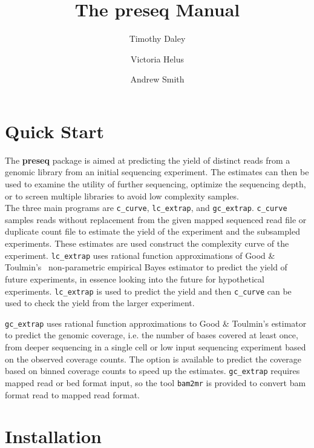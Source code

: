 \documentclass[11pt, titlepage]{article}
\title{The preseq Manual}
\author{Timothy Daley \and Victoria Helus \and Andrew Smith }
\begin{document}
\maketitle

\tableofcontents

\newpage

\section{Quick Start}
\label{chap:quickstart}
\newcommand{\fn}[1]{\texttt{#1}}



The \textbf{preseq} package is aimed at predicting
the yield of distinct reads from a genomic library
from an initial sequencing experiment.  The estimates
can then be used to examine the utility of further
sequencing, optimize the sequencing depth,
or to screen multiple libraries to avoid low complexity
samples.~\\[-.2cm]

\noindent The three main programs are \fn{c\_curve}, \fn{lc\_extrap},
and \fn{gc\_extrap}.
\fn{c\_curve} samples reads without replacement from the 
given mapped sequenced read file or duplicate count file to estimate the yield
of the experiment and the subsampled experiments.  These estimates
are used construct the complexity
curve of the experiment.  \fn{lc\_extrap} uses rational function approximations
of Good \& Toulmin's~\cite{good1956number} non-parametric
empirical Bayes estimator to predict the yield
of future experiments, in essence looking into the future
for hypothetical experiments.  \fn{lc\_extrap} is used to predict 
the yield and then \fn{c\_curve} can be used to check the yield
from the larger experiment.

\fn{gc\_extrap} uses rational function approximations
to Good \& Toulmin's estimator to predict the genomic
coverage, i.e. the number of bases covered at least once,
from deeper sequencing in a single cell or low input sequencing
experiment based on the observed coverage counts.
The option is available to predict the coverage based on binned
coverage counts to speed up the estimates.  
\fn{gc\_extrap} requires mapped read or bed format
input, so the tool \fn{bam2mr} is provided to convert
bam format read to mapped read format.

\newpage

\section{Installation}
\label{sec:install}
\end{document}
